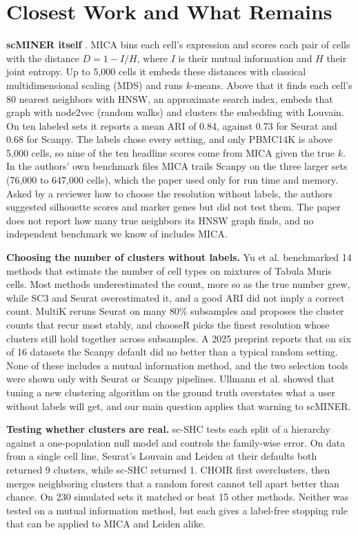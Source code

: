 \section{Closest Work and What Remains}\label{sec:related}
\textbf{scMINER itself} \cite{pan2025scminer}. MICA bins each cell's expression and scores each pair of cells with the distance $D = 1 - I/H$, where $I$ is their mutual information and $H$ their joint entropy. Up to 5,000 cells it embeds these distances with classical multidimensional scaling (MDS) and runs $k$-means. Above that it finds each cell's 80 nearest neighbors with HNSW, an approximate search index, embeds that graph with node2vec (random walks) and clusters the embedding with Louvain. On ten labeled sets it reports a mean ARI of 0.84, against 0.73 for Seurat and 0.68 for Scanpy. The labels chose every setting, and only PBMC14K is above 5,000 cells, so nine of the ten headline scores come from MICA given the true $k$. In the authors' own benchmark files MICA trails Scanpy on the three larger sets (76,000 to 647,000 cells), which the paper used only for run time and memory. Asked by a reviewer how to choose the resolution without labels, the authors suggested silhouette scores and marker genes but did not test them. The paper does not report how many true neighbors its HNSW graph finds, and no independent benchmark we know of includes MICA.

\textbf{Choosing the number of clusters without labels.} Yu et al. \cite{yu2022benchmarking} benchmarked 14 methods that estimate the number of cell types on mixtures of Tabula Muris cells. Most methods underestimated the count, more so as the true number grew, while SC3 and Seurat overestimated it, and a good ARI did not imply a correct count. MultiK \cite{liu2021multik} reruns Seurat on many 80\% subsamples and proposes the cluster counts that recur most stably, and chooseR \cite{pattersoncross2021chooser} picks the finest resolution whose clusters still hold together across subsamples. A 2025 preprint \cite{szmigiel2025benchmarking} reports that on six of 16 datasets the Scanpy default did no better than a typical random setting. None of these includes a mutual information method, and the two selection tools were shown only with Seurat or Scanpy pipelines. Ullmann et al. \cite{ullmann2023overoptimistic} showed that tuning a new clustering algorithm on the ground truth overstates what a user without labels will get, and our main question applies that warning to scMINER.

\textbf{Testing whether clusters are real.} sc-SHC \cite{grabski2023significance} tests each split of a hierarchy against a one-population null model and controls the family-wise error. On data from a single cell line, Seurat's Louvain and Leiden at their defaults both returned 9 clusters, while sc-SHC returned 1. CHOIR \cite{sant2025choir} first overclusters, then merges neighboring clusters that a random forest cannot tell apart better than chance. On 230 simulated sets it matched or beat 15 other methods. Neither was tested on a mutual information method, but each gives a label-free stopping rule that can be applied to MICA and Leiden alike.

